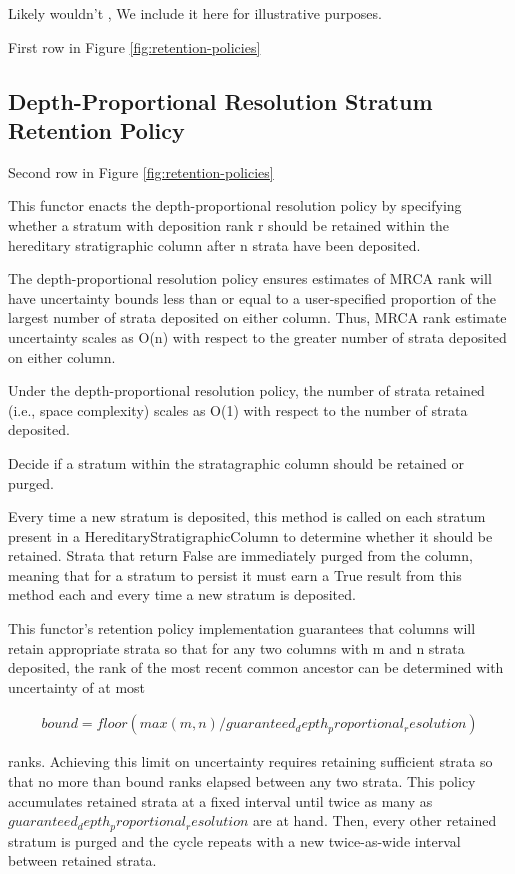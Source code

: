 Likely wouldn't ,
We include it here for illustrative purposes.

First row in Figure \ref{fig:retention-policies}

\subsection{Depth-Proportional Resolution Stratum Retention Policy}

Second row in Figure \ref{fig:retention-policies}

This functor enacts the depth-proportional resolution policy by specifying
whether a stratum with deposition rank r should be retained within the
hereditary stratigraphic column after n strata have been deposited.

The depth-proportional resolution policy ensures estimates of MRCA rank will
have uncertainty bounds less than or equal to a user-specified
proportion of the largest number of strata deposited on either column.
Thus, MRCA rank estimate uncertainty scales as O(n) with respect to the
greater number of strata deposited on either column.

Under the depth-proportional resolution policy, the number of strata
retained (i.e., space complexity) scales as O(1) with respect to the number
of strata deposited.

Decide if a stratum within the stratagraphic column should be
retained or purged.

Every time a new stratum is deposited, this method is called on each
stratum present in a HereditaryStratigraphicColumn to determine whether
it should be retained. Strata that return False are immediately purged
from the column, meaning that for a stratum to persist it must earn a
True result from this method each and every time a new stratum is
deposited.

This functor's retention policy implementation guarantees that columns
will retain appropriate strata so that for any two columns with m and n
strata deposited, the rank of the most recent common ancestor can be
determined with uncertainty of at most

\begin{align*}
    bound = floor(max(m, n) / guaranteed_depth_proportional_resolution)
\end{align*}

ranks. Achieving this limit on uncertainty requires retaining sufficient
strata so that no more than bound ranks elapsed between any two strata.
This policy accumulates retained strata at a fixed interval until twice
as many as $guaranteed_depth_proportional_resolution$ are at hand. Then,
every other retained stratum is purged and the cycle repeats with a new
twice-as-wide interval between retained strata.

